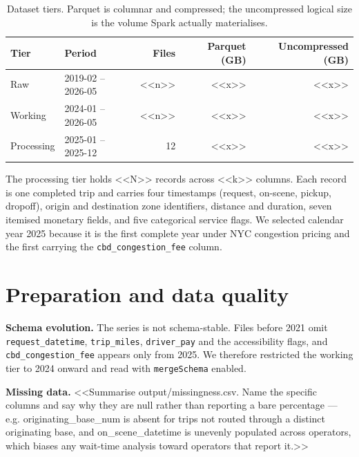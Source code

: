 \documentclass[10pt,a4paper]{article}
\begin{document}
\begin{table}[h]\centering\small
\caption{Dataset tiers. Parquet is columnar and compressed; the uncompressed
logical size is the volume Spark actually materialises.}
\label{tab:scale}
\begin{tabular}{@{}llrrr@{}}
\toprule
Tier & Period & Files & Parquet (GB) & Uncompressed (GB) \\
\midrule
Raw        & 2019-02 -- 2026-05 & <<n>>  & <<x>> & <<x>> \\
Working    & 2024-01 -- 2026-05 & <<n>>  & <<x>> & <<x>> \\
Processing & 2025-01 -- 2025-12 & 12     & <<x>> & <<x>> \\
\bottomrule
\end{tabular}
\end{table}

The processing tier holds <<N>> records across <<k>> columns. Each record is one
completed trip and carries four timestamps (request, on-scene, pickup,
dropoff), origin and destination zone identifiers, distance and duration,
seven itemised monetary fields, and five categorical service flags. We selected
calendar year 2025 because it is the first complete year under NYC congestion
pricing and the first carrying the \texttt{cbd\_congestion\_fee} column.

\section{Preparation and data quality}

\textbf{Schema evolution.} The series is not schema-stable. Files before 2021
omit \texttt{request\_datetime}, \texttt{trip\_miles}, \texttt{driver\_pay} and
the accessibility flags, and \texttt{cbd\_congestion\_fee} appears only from
2025. We therefore restricted the working tier to 2024 onward and read with
\texttt{mergeSchema} enabled.

\textbf{Missing data.} <<Summarise output/missingness.csv. Name the specific
columns and say why they are null rather than reporting a bare percentage ---
e.g. originating\_base\_num is absent for trips not routed through a distinct
originating base, and on\_scene\_datetime is unevenly populated across
operators, which biases any wait-time analysis toward operators that report
it.>>
\end{document}
